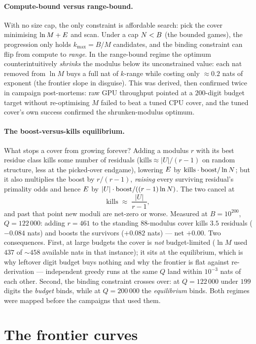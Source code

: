 \paragraph{Compute-bound versus range-bound.} With no size cap, the only
constraint is affordable search: pick the cover minimising
$\ln M+E$ and scan. Under a cap $N<B$ (the bounded games), the
progression only holds $k_{\max}=B/M$ candidates, and the binding
constraint can flip from compute to \emph{range}. In the range-bound
regime the optimum counterintuitively \emph{shrinks} the modulus below
its unconstrained value: each nat removed from $\ln M$ buys a full nat
of $k$-range while costing only $\approx0.2$ nats of exponent (the
frontier slope in disguise). This was derived, then confirmed twice in
campaign post-mortems: raw GPU throughput pointed at a $200$-digit
budget target without re-optimising $M$ failed to beat a tuned CPU
cover, and the tuned cover's own success confirmed the shrunken-modulus
optimum.

\paragraph{The boost-versus-kills equilibrium.} What stops a cover from
growing forever? Adding a modulus $r$ with its best residue class kills
some number of residuals ($\mathrm{kills}\approx|U|/(r-1)$ on random
structure, less at the picked-over endgame), lowering $E$ by
$\mathrm{kills}\cdot\mathrm{boost}/\ln N$; but it also multiplies the
boost by $r/(r-1)$, \emph{raising} every surviving residual's primality
odds and hence $E$ by $|U|\cdot\mathrm{boost}/((r-1)\ln N)$. The two
cancel at
\[
\mathrm{kills}\;\approx\;\frac{|U|}{r-1},
\]
and past that point new moduli are net-zero or worse. Measured at
$B=10^{200}$, $Q=122\,000$: adding $r=461$ to the standing $88$-modulus
cover kills $3.5$ residuals ($-0.084$ nats) and boosts the survivors
($+0.082$ nats) --- net $+0.00$. Two consequences. First, at large
budgets the cover is \emph{not} budget-limited ($\ln M$ used $437$ of
$\sim458$ available nats in that instance); it sits at the equilibrium,
which is why leftover digit budget buys nothing and why the frontier is
flat against re-derivation --- independent greedy runs at the same $Q$
land within $10^{-3}$ nats of each other. Second, the binding constraint
crosses over: at $Q=122\,000$ under $199$ digits the \emph{budget}
binds, while at $Q=200\,000$ the \emph{equilibrium} binds. Both regimes
were mapped before the campaigns that used them.

\section{The frontier curves}\label{sec:frontiers}

